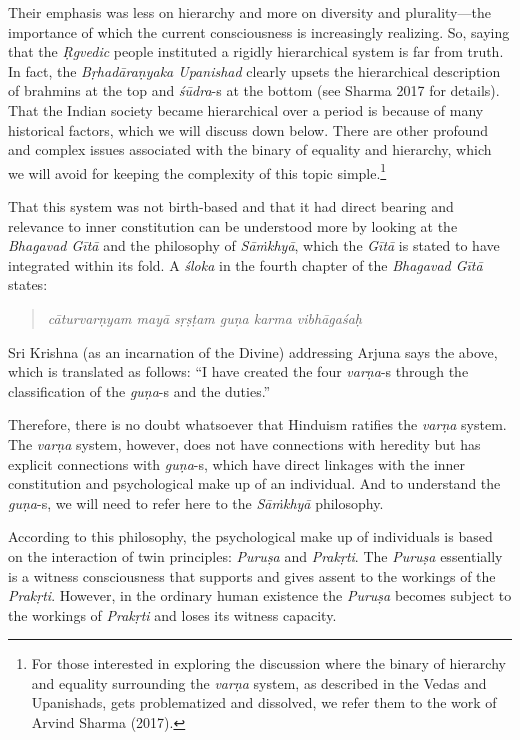 Their emphasis was less on hierarchy and more on diversity and plurality—the importance of which the current consciousness is increasingly realizing. So, saying that the \textit{Ṛgvedic} people instituted a rigidly hierarchical system is far from truth. In fact, the \textit{Bṛhadāraṇyaka Upanishad} clearly upsets the hierarchical description of brahmins at the top and \textit{śūdra}-s at the bottom (see Sharma 2017 for details). That the Indian society became hierarchical over a period is because of many historical factors, which we will discuss down below. There are other profound and complex issues associated with the binary of equality and hierarchy, which we will avoid for keeping the complexity of this topic simple.\footnote{For those interested in exploring the discussion where the binary of hierarchy and equality surrounding the \textit{varṇa} 	system, as described in the Vedas and Upanishads, gets problematized and dissolved, we refer them to the work of Arvind Sharma (2017).}

That this system was not birth-based and that it had direct bearing and relevance to inner constitution can be understood more by looking at the \textit{Bhagavad Gītā} and the philosophy of \textit{Sāṁkhyā}, which the \textit{Gītā} is stated to have integrated within its fold. A \textit{śloka} in the fourth chapter of the \textit{Bhagavad Gītā} states:
\begin{quote}
\textit{cāturvarṇyam mayā sṛṣṭam guṇa karma vibhāgaśaḥ} 
\end{quote}
Sri Krishna (as an incarnation of the Divine) addressing Arjuna says the above, which is translated as follows: “I have created the four \textit{varṇa}-s through the classification of the \textit{guṇa}-s and the duties.”

Therefore, there is no doubt whatsoever that Hinduism ratifies the \textit{varṇa} system. The \textit{varṇa} system, however, does not have connections with heredity but has explicit connections with \textit{guṇa}-s,  which have direct linkages with the inner constitution and psychological make up of an individual. And to understand the \textit{guṇa}-s,  we will need to refer here to the \textit{Sāṁkhyā} philosophy. 

According to this philosophy, the psychological make up of individuals is based on the interaction of twin principles: \textit{Puruṣa} and \textit{Prakṛti}. The \textit{Puruṣa} essentially is a witness consciousness that supports and gives assent to the workings of the \textit{Prakṛti}. However, in the ordinary human existence the \textit{Puruṣa} becomes subject to the workings of \textit{Prakṛti} and loses its witness capacity. 

